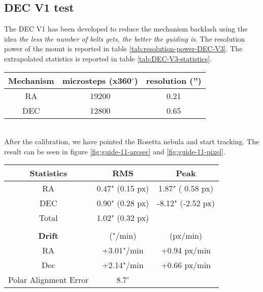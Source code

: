 \subsection{DEC V1 test}
The DEC V1 has been developed to reduce the mechanism backlash using the idea \textit{the less the number of belts gets, the better the guiding is}.
The resolution power of the mount is reported in table \ref{tab:resolution-power-DEC-V3}.
The extrapolated statistics is reported in table \ref{tab:DEC-V3-statistics}.
\\
\begin{minipage}
    {.5\textwidth}
    \begin{tabular}{ccc}
        \textbf{Mechanism} & \textbf{microsteps (x360$^{\circ}$)} &\textbf{resolution ('')}\\
        \hline
        RA  & 19200 & 0.21\\ 
        DEC & 12800 & 0.65
    \end{tabular}
    \label{tab:resolution-power-DEC-V3}
\end{minipage}
\\
After the calibration, we have pointed the Rosetta nebula and start tracking.
The result can be seen in figure \ref{fig:guide-11-arcsec} and \ref{fig:guide-11-pixel}.
\\
\begin{minipage}{.4\textwidth}
    \centering
    \begin{tabular}{ccc}
        \textbf{Statistics}&RMS&Peak\\
        \hline
        RA& 0.47" (0.15 px)& 1.87" ( 0.58 px)\\
        DEC& 0.90" (0.28 px)&-8.12" (-2.52 px)\\
        Total& 1.02" (0.32 px)&\\
        \\
        \textbf{Drift}& ("/min) & (px/min)\\
        \hline
        RA& +3.01"/min& +0.94 px/min\\
        Dec& +2.14"/min& +0.66 px/min\\
        Polar Alignment Error& 8.7'&\\
        \hline
    \end{tabular}
    \label{tab:DEC-V3-statistics}
\end{minipage}

